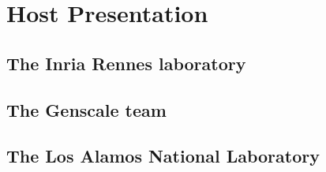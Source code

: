 \chapter{Host Presentation}

\section{The Inria Rennes laboratory}

\section{The Genscale team}

\section{The Los Alamos National Laboratory}

\newpage